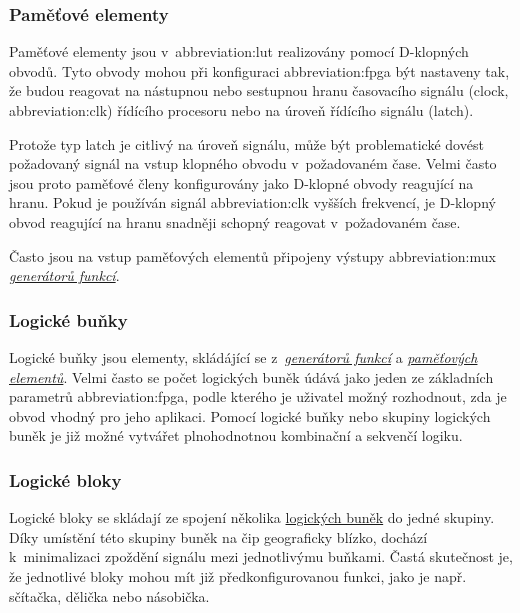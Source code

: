 \documentclass[a4paper, twoside, 11pt]{article}
\begin{document}
	\subsubsection{Paměťové elementy}\label{subsubsec:pametove-elementy}
		Paměťové elementy jsou v~\gls{abbreviation:lut} realizovány pomocí D-klopných obvodů. Tyto obvody mohou při konfiguraci \gls{abbreviation:fpga} být nastaveny tak, že budou reagovat na nástupnou nebo sestupnou hranu časovacího signálu (clock, \gls{abbreviation:clk}) řídícího procesoru nebo na úroveň řídícího signálu (latch).\cite{Sass2010}\par
		Protože typ latch je citlivý na úroveň signálu, může být problematické dovést požadovaný signál na vstup klopného obvodu v~požadovaném čase. Velmi často jsou proto paměťové členy konfigurovány jako D-klopné obvody reagující na hranu. Pokud je používán signál \gls{abbreviation:clk} vyšších frekvencí, je D-klopný obvod reagující na hranu snadněji schopný reagovat v~požadovaném čase. \cite{Sass2010}\par
		Často jsou na vstup paměťových elementů připojeny výstupy \gls{abbreviation:mux} \hyperref[subsubsec:generatory-funkci]{\textit{generátorů funkcí}}. \cite{Sass2010}

		\subsubsection{Logické buňky}\label{subsubsec:logicke-bunky}
			Logické buňky jsou elementy, skládájící se z~\hyperref[subsubsec:generatory-funkci]{\textit{generátorů funkcí}} a \hyperref[subsubsec:pametove-elementy]{\textit{paměťových elementů}}. Velmi často se počet logických buněk údává jako jeden ze základních parametrů \gls{abbreviation:fpga}, podle kterého je uživatel možný rozhodnout, zda je obvod vhodný pro jeho aplikaci. Pomocí logické buňky nebo skupiny logických buněk je již možné vytvářet plnohodnotnou kombinační a sekvenčí logiku.\cite{Sass2010}

			\newpage
		\subsubsection{Logické bloky}\label{subsubsec:logicke-bloky}
			Logické bloky se skládají ze spojení několika \hyperref[subsubsec:logicke-bunky]{logických buněk} do jedné skupiny. Díky umístění této skupiny buněk na čip geograficky blízko, dochází k~minimalizaci zpoždění signálu mezi jednotlivýmu buňkami. Častá skutečnost je, že jednotlivé bloky mohou mít již předkonfigurovanou funkci, jako je např. sčítačka, dělička nebo násobička. \cite{Sass2010}
\end{document}

